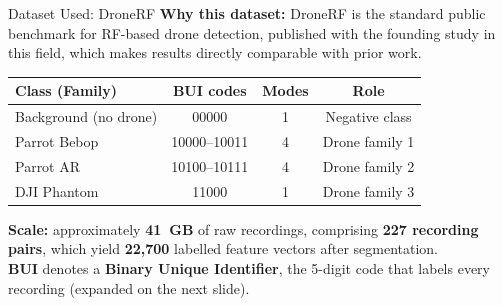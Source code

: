 \documentclass[aspectratio=169,11pt]{beamer}
\begin{document}
\begin{frame}{Dataset Used: DroneRF}
\footnotesize
\textbf{Why this dataset:} DroneRF is the standard public benchmark for RF-based
drone detection, published with the founding study in this field, which makes
results directly comparable with prior work.
\vspace{0.15cm}

\centering
\scriptsize
\begin{tabular}{|l|c|c|c|}
\hline
\textbf{Class (Family)} & \textbf{BUI codes} & \textbf{Modes} & \textbf{Role} \\
\hline
Background (no drone) & 00000 & 1 & Negative class \\
\hline
Parrot Bebop & 10000--10011 & 4 & Drone family 1 \\
\hline
Parrot AR & 10100--10111 & 4 & Drone family 2 \\
\hline
DJI Phantom & 11000 & 1 & Drone family 3 \\
\hline
\end{tabular}
\vspace{0.2cm}

\raggedright\footnotesize
\textbf{Scale:} approximately \textbf{41~GB} of raw recordings, comprising
\textbf{227 recording pairs}, which yield \textbf{22{,}700} labelled feature
vectors after segmentation.\\
\textbf{BUI} denotes a \textbf{Binary Unique Identifier}, the 5-digit code that
labels every recording (expanded on the next slide).
\end{frame}
\end{document}
